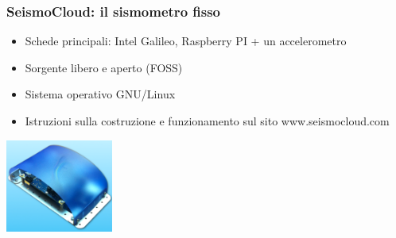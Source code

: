 \begin{frame}
	\frametitle{SeismoCloud: il sismometro fisso}
	
	\begin{itemize}
		\item Schede principali: Intel Galileo, Raspberry PI + un accelerometro
		\item Sorgente libero e aperto (FOSS)
		\item Sistema operativo GNU/Linux
		\item Istruzioni sulla costruzione e funzionamento sul sito www.seismocloud.com
	\end{itemize}
	
	\includegraphics[keepaspectratio=true,width=100pt]{galileo}
	
\end{frame}
